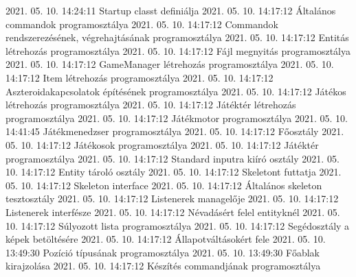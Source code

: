  {2021. 05. 10. 14:24:11} {Startup classt definiálja}
 {2021. 05. 10. 14:17:12} {Általános commandok programosztálya}
 {2021. 05. 10. 14:17:12} {Commandok rendszerezésének, végrehajtásának programosztálya}
 {2021. 05. 10. 14:17:12} {Entitás létrehozás programosztálya}
 {2021. 05. 10. 14:17:12} {Fájl megnyitás programosztálya}
 {2021. 05. 10. 14:17:12} {GameManager létrehozás programosztálya}
 {2021. 05. 10. 14:17:12} {Item létrehozás programosztálya}
 {2021. 05. 10. 14:17:12} {Aszteroidakapcsolatok építésének programosztálya}
 {2021. 05. 10. 14:17:12} {Játékos létrehozás programosztálya}
 {2021. 05. 10. 14:17:12} {Játéktér létrehozás programosztálya}
 {2021. 05. 10. 14:17:12} {Játékmotor programosztálya}
 {2021. 05. 10. 14:41:45} {Játékmenedzser programosztálya}
 {2021. 05. 10. 14:17:12} {Főosztály}
 {2021. 05. 10. 14:17:12} {Játékosok programosztálya}
 {2021. 05. 10. 14:17:12} {Játéktér programosztálya}
 {2021. 05. 10. 14:17:12} {Standard inputra kiíró osztály}
 {2021. 05. 10. 14:17:12} {Entity tároló osztály}
 {2021. 05. 10. 14:17:12} {Skeletont futtatja}
 {2021. 05. 10. 14:17:12} {Skeleton interface}
 {2021. 05. 10. 14:17:12} {Általános skeleton tesztosztály}
 {2021. 05. 10. 14:17:12} {Listenerek managelője}
 {2021. 05. 10. 14:17:12} {Listenerek interfésze}
 {2021. 05. 10. 14:17:12} {Névadásért felel entityknél}
 {2021. 05. 10. 14:17:12} {Súlyozott lista programosztálya}
 {2021. 05. 10. 14:17:12} {Segédosztály a képek betöltésére}
 {2021. 05. 10. 14:17:12} {Állapotváltásokért fele}
 {2021. 05. 10. 13:49:30} {Pozíció típusának programosztálya}
 {2021. 05. 10. 13:49:30} {Főablak kirajzolása}
 {2021. 05. 10. 14:17:12} {Készítés commandjának programosztálya}
